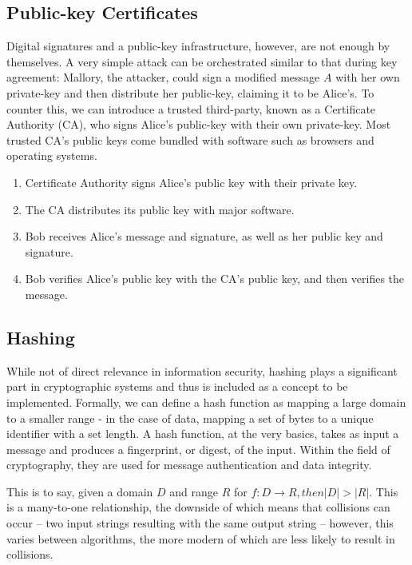 \subsection{Public-key Certificates}

Digital signatures and a public-key infrastructure, however, are not enough by themselves. A very simple attack can be orchestrated similar to that during key agreement: Mallory, the attacker, could sign a modified message $A$ with her own private-key and then distribute her public-key, claiming it to be Alice's. To counter this, we can introduce a trusted third-party, known as a Certificate Authority (CA), who signs Alice's public-key with their own private-key. Most trusted CA's public keys come bundled with software such as browsers and operating systems.

\begin{enumerate}
	\item Certificate Authority signs Alice's public key with their private key.
	\item The CA distributes its public key with major software.
	\item Bob receives Alice's message and signature, as well as her public key and signature.
	\item Bob verifies Alice's public key with the CA's public key, and then verifies the message.
\end{enumerate}

\subsection{Hashing}

While not of direct relevance in information security, hashing plays a significant part in cryptographic systems and thus is included as a concept to be implemented. Formally, we can define a hash function as mapping a large domain to a smaller range - in the case of data, mapping a set of bytes to a unique identifier with a set length. A hash function, at the very basics, takes as input a message and produces a fingerprint, or digest, of the input. Within the field of cryptography, they are used for message authentication and data integrity.

This is to say, given a domain $D$ and range $R$ for $f : D \rightarrow R, then |D| > |R|$. This is a many-to-one relationship, the downside of which means that collisions can occur -- two input strings resulting with the same output string -- however, this varies between algorithms, the more modern of which are less likely to result in collisions.

